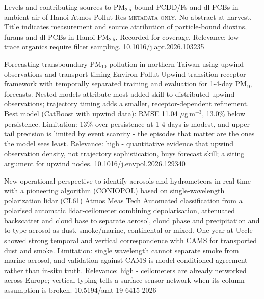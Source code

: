 \documentclass[10pt]{article}
\begin{document}
{Levels and contributing sources to PM$_{2.5}$-bound PCDD/Fs and dl-PCBs in ambient air of Hanoi}
{Atmos Pollut Res}
{\textsc{metadata only.} No abstract at harvest. Title indicates measurement and source attribution of particle-bound dioxins, furans and dl-PCBs in Hanoi PM$_{2.5}$. Recorded for coverage. Relevance: low - trace organics require filter sampling.}
{10.1016/j.apr.2026.103235}

\par{}\baselineskip{}\baselineskip
{}

{Forecasting transboundary PM$_{10}$ pollution in northern Taiwan using upwind observations and transport timing}
{Environ Pollut}
{Upwind-transition-receptor framework with temporally separated training and evaluation for 1-4-day PM$_{10}$ forecasts. Nested models attribute most added skill to distributed upwind observations; trajectory timing adds a smaller, receptor-dependent refinement. Best model (CatBoost with upwind data): RMSE 11.04 $\mu$g\,m$^{-3}$, 13.0\% below persistence. Limitation: 13\% over persistence at 1-4 days is modest, and upper-tail precision is limited by event scarcity - the episodes that matter are the ones the model sees least. Relevance: high - quantitative evidence that upwind observation density, not trajectory sophistication, buys forecast skill; a siting argument for upwind nodes.}
{10.1016/j.envpol.2026.129340}

{New operational perspective to identify aerosols and hydrometeors in real-time with a pioneering algorithm (CONIOPOL) based on single-wavelength polarization lidar (CL61)}
{Atmos Meas Tech}
{Automated classification from a polarised automatic lidar-ceilometer combining depolarisation, attenuated backscatter and cloud base to separate aerosol, cloud phase and precipitation and to type aerosol as dust, smoke/marine, continental or mixed. One year at Uccle showed strong temporal and vertical correspondence with CAMS for transported dust and smoke. Limitation: single wavelength cannot separate smoke from marine aerosol, and validation against CAMS is model-conditioned agreement rather than in-situ truth. Relevance: high - ceilometers are already networked across Europe; vertical typing tells a surface sensor network when its column assumption is broken.}
{10.5194/amt-19-6415-2026}
\end{document}
